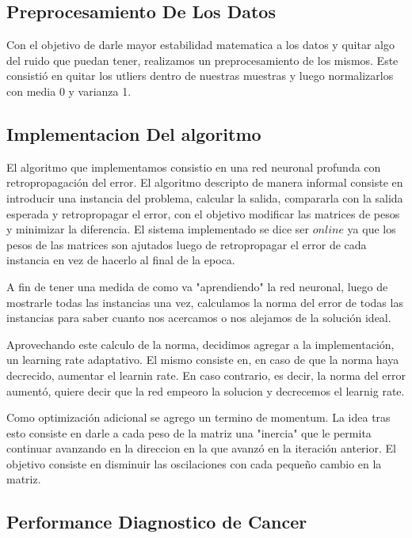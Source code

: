 \subsection{Preprocesamiento De Los Datos} 
Con el objetivo de darle mayor estabilidad matematica a los datos y quitar algo del ruido que puedan tener, realizamos un preprocesamiento de los mismos. Este consistió en quitar los utliers dentro de nuestras muestras y luego normalizarlos con media 0 y varianza 1.

\subsection{Implementacion Del algoritmo} 

El algoritmo que implementamos consistio en una red neuronal profunda con retropropagación del error. El algoritmo descripto de manera informal consiste en introducir una instancia del problema, calcular la salida, compararla con la salida esperada y retropropagar el error, con el objetivo modificar las matrices de pesos y minimizar la diferencia. El sistema implementado se dice ser $online$ ya que los pesos de las matrices son ajutados luego de retropropagar el error de cada instancia en vez de hacerlo al final de la epoca.

A fin de tener una medida de como va "aprendiendo" la red neuronal, luego de mostrarle todas las instancias una vez, calculamos la norma del error de todas las instancias para saber cuanto nos acercamos o nos alejamos de la solución ideal.

Aprovechando este calculo de la norma, decidimos agregar a la implementación, un learning rate adaptativo. El mismo consiste en, en caso de que la norma haya decrecido, aumentar el learnin rate. En caso contrario, es decir, la norma del error aumentó, quiere decir que la red empeoro la solucion y decrecemos el learnig rate.

Como optimización adicional se agrego un termino de momentum. La idea tras esto consiste en darle a cada peso de la matriz una "inercia" que le permita continuar avanzando en la direccion en la que avanzó en la iteración anterior. El objetivo consiste en disminuir las oscilaciones con cada pequeño cambio en la matriz.

\subsection{Performance Diagnostico de Cancer} 

